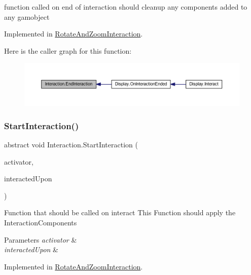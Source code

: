 function called on end of interaction should cleanup any components added to any gamobject 



Implemented in \mbox{\hyperlink{class_rotate_and_zoom_interaction_af0c13721da9fee4e1f7ce226d4cf7bea}{Rotate\+And\+Zoom\+Interaction}}.

Here is the caller graph for this function\+:
\nopagebreak
\begin{figure}[H]
\begin{center}
\leavevmode
\includegraphics[width=350pt]{class_interaction_a13c7d99dbecf8e0d61973fd23de6400c_icgraph}
\end{center}
\end{figure}
\mbox{\label{class_interaction_afa5031e1db8f7c23cf26c896937e69f9}} 
\subsubsection{\texorpdfstring{Start\+Interaction()}{StartInteraction()}}
{\footnotesize\ttfamily abstract void Interaction.\+Start\+Interaction (\begin{DoxyParamCaption}\item[{Game\+Object}]{activator,  }\item[{Game\+Object}]{interacted\+Upon }\end{DoxyParamCaption})\hspace{0.3cm}{\ttfamily [pure virtual]}}



Function that should be called on interact This Function should apply the Interaction\+Components 


\begin{DoxyParams}{Parameters}
{\em activator} & \\
\hline
{\em interacted\+Upon} & \\
\hline
\end{DoxyParams}


Implemented in \mbox{\hyperlink{class_rotate_and_zoom_interaction_ad92e1c40e9cbb2fb3dcf234e72d0e595}{Rotate\+And\+Zoom\+Interaction}}.

